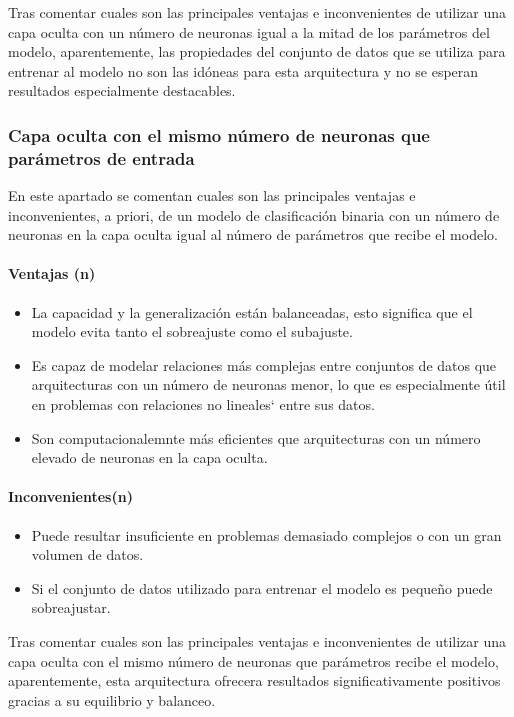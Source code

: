 Tras comentar cuales son las principales ventajas e inconvenientes de utilizar una capa oculta con un número de neuronas igual a la mitad de los parámetros del modelo, aparentemente, las propiedades del conjunto de datos que se utiliza para entrenar al modelo no son las idóneas para esta arquitectura y no se esperan resultados especialmente destacables.

\subsubsection{Capa oculta con el mismo número de neuronas que parámetros de entrada}\label{sec:VIBIN49}
En este apartado se comentan cuales son las principales ventajas e inconvenientes, a priori, de un modelo de clasificación binaria con un número de neuronas en la capa oculta igual al número de parámetros que recibe el modelo.

\paragraph{Ventajas (n)}
\begin{itemize}
	\item La capacidad y la generalización están balanceadas, esto significa que el modelo evita tanto el sobreajuste como el subajuste.
	\item Es capaz de modelar relaciones más complejas entre conjuntos de datos que arquitecturas con un número de neuronas menor, lo que es especialmente útil en problemas con relaciones no lineales` entre sus datos.
	\item Son computacionalemnte más eficientes que arquitecturas con un número elevado de neuronas en la capa oculta. 
\end{itemize}
\paragraph{Inconvenientes(n)}
\begin{itemize}
	\item Puede resultar insuficiente en problemas demasiado complejos o con un gran volumen de datos.
	\item Si el conjunto de datos utilizado para entrenar el modelo es pequeño puede sobreajustar.
\end{itemize}

Tras comentar cuales son las principales ventajas e inconvenientes de utilizar una capa oculta con el mismo número de neuronas que parámetros recibe el modelo, aparentemente, esta arquitectura ofrecera resultados significativamente positivos gracias a su equilibrio y balanceo.

